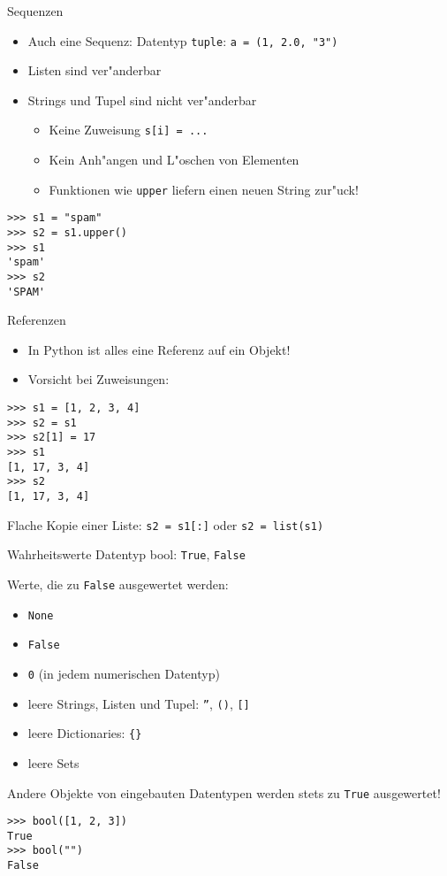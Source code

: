 \begin{frame}[fragile]{Sequenzen}
\begin{itemize}
\item Auch eine Sequenz: Datentyp \alert{\texttt{tuple}}: \lstinline{a = (1, 2.0, "3")}
\item Listen sind ver"anderbar
\item Strings und Tupel sind nicht ver"anderbar
\begin{itemize}
\item Keine Zuweisung \lstinline{s[i] = ...}
\item Kein Anh"angen und L"oschen von Elementen
\item Funktionen wie \texttt{upper} liefern einen neuen String zur"uck!
\end{itemize}
\end{itemize}
\begin{lstlisting}[style=Shell]
>>> s1 = "spam"
>>> s2 = s1.upper()
>>> s1
'spam'
>>> s2
'SPAM'
\end{lstlisting}
\end{frame}

\begin{frame}[fragile]{Referenzen}
\begin{itemize}
\item In Python ist alles eine Referenz auf ein Objekt!
\item Vorsicht bei Zuweisungen:
\end{itemize}
\begin{lstlisting}[style=Shell]
>>> s1 = [1, 2, 3, 4]
>>> s2 = s1
>>> s2[1] = 17
>>> s1
[1, 17, 3, 4]
>>> s2
[1, 17, 3, 4]
\end{lstlisting}
Flache Kopie einer Liste: \lstinline{s2 = s1[:]} oder \lstinline{s2 = list(s1)}
\end{frame}

\begin{frame}[fragile]{Wahrheitswerte}
Datentyp \alert{bool}: \texttt{True}, \texttt{False}

Werte, die zu \texttt{False} ausgewertet werden:
\begin{itemize}
\item \texttt{None}
\item \texttt{False}
\item \texttt{0} (in jedem numerischen Datentyp)
\item leere Strings, Listen und Tupel: \texttt{''}, \texttt{()}, \texttt{[]}
\item leere Dictionaries: \texttt{\{\}}
\item leere Sets
\end{itemize}
Andere Objekte von eingebauten Datentypen werden stets zu \texttt{True} ausgewertet!
\begin{lstlisting}[style=Shell]
>>> bool([1, 2, 3])
True
>>> bool("")
False
\end{lstlisting}
\end{frame}

